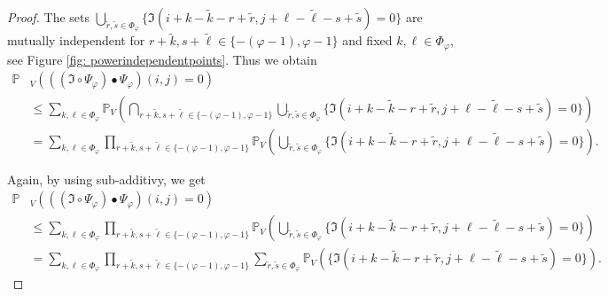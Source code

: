 \documentclass[a4paper,12pt]{article}
\theoremstyle{plain}
\theoremstyle{definition}
\begin{document}
\begin{appendix}
\begin{proof}
		
		
		The sets $\bigcup_{\tilde{r}, \tilde{s} \in \Phi_\varphi} \{ \mathfrak{I}(i + k - \tilde{k} - r + \tilde{r}, j + \ell - \tilde{\ell} - s + \tilde{s}) = 0 \}$ are mutually independent for $r + \tilde{k}, s + \tilde{\ell} \in \{ - ( \varphi - 1 ), \varphi - 1 \}$ and fixed $k, \ell \in \Phi_\varphi$, see Figure \ref{fig: powerindependentpoints}. Thus we obtain
		\begin{align*}
			\mathbb{P}&_V\left( ((\mathfrak{I} \circ \Psi_\varphi) \bullet \Psi_\varphi)(i, j) = 0 \right) \\
			&\leq \sum_{k, \ell \in \Phi_\varphi} \mathbb{P}_V\left( \bigcap_{r + \tilde{k}, s + \tilde{\ell} \in \{ - ( \varphi - 1 ), \varphi - 1 \}} \bigcup_{\tilde{r}, \tilde{s} \in \Phi_\varphi} \{ \mathfrak{I}(i + k - \tilde{k} - r + \tilde{r}, j + \ell - \tilde{\ell} - s + \tilde{s}) = 0 \} \right) \\
			&= \sum_{k, \ell \in \Phi_\varphi} \prod_{r + \tilde{k}, s + \tilde{\ell} \in \{ - ( \varphi - 1 ), \varphi - 1 \}} \mathbb{P}_V\left( \bigcup_{\tilde{r}, \tilde{s} \in \Phi_\varphi} \{ \mathfrak{I}(i + k - \tilde{k} - r + \tilde{r}, j + \ell - \tilde{\ell} - s + \tilde{s}) = 0 \} \right).
		\end{align*}
		
		Again, by using sub-additivy, we get
		\begin{align*}
			\mathbb{P}&_V\left( ((\mathfrak{I} \circ \Psi_\varphi) \bullet \Psi_\varphi)(i, j) = 0 \right) \\
			&\leq \sum_{k, \ell \in \Phi_\varphi} \prod_{r + \tilde{k}, s + \tilde{\ell} \in \{ - ( \varphi - 1 ), \varphi - 1 \}} \mathbb{P}_V\left( \bigcup_{\tilde{r}, \tilde{s} \in \Phi_\varphi} \{ \mathfrak{I}(i + k - \tilde{k} - r + \tilde{r}, j + \ell - \tilde{\ell} - s + \tilde{s}) = 0 \} \right) \\
			&= \sum_{k, \ell \in \Phi_\varphi} \prod_{r + \tilde{k}, s + \tilde{\ell} \in \{ - ( \varphi - 1 ), \varphi - 1 \}} \sum_{\tilde{r}, \tilde{s} \in \Phi_\varphi} \mathbb{P}_V\left( \{ \mathfrak{I}(i + k - \tilde{k} - r + \tilde{r}, j + \ell - \tilde{\ell} - s + \tilde{s}) = 0 \} \right).
		\end{align*}
		

\end{proof}
\end{appendix}
\end{document}
